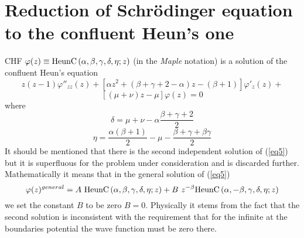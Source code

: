 \documentclass[singlespacing]{elsart}
\begin{document}
\section{Reduction of Schr\"odinger equation to the confluent Heun's one}
CHF $\varphi (z) \equiv {\rm HeunC}\left(\alpha,\beta,\gamma, \delta,
\eta;z\right)$  (in the {\sl {Maple}} notation) is a solution of the confluent Heun's equation
\[
z(z-1)\varphi''_{zz}(z)+\left[\alpha z^2+(\beta+\gamma+2-\alpha)z-\left(\beta+1\right)\right]\varphi'_z(z)+
\]
\begin{equation}
\label{eq5}
\left[(\mu+\nu)z-\mu\right]\varphi (z)=0
\end{equation}
where
\begin{equation}
\label{eq6}\delta=\mu+\nu-\alpha\frac{\beta+\gamma+2}{2}
\end{equation}
\begin{equation}
\label{eq7}\eta=\frac{\alpha\left(\beta+1\right)}{2}-\mu-\frac{\beta+\gamma+\beta\gamma}{2}
\end{equation}
It should be mentioned that there is the second independent solution of (\ref{eq5})
but it is superfluous for the problem under consideration and is discarded further. Mathematically it means that in the general solution of (\ref{eq5})
\[
\varphi (z)^{general}=A\ {\rm HeunC}\left(\alpha,\beta,\gamma, \delta,
\eta;z\right)+B\ z^{-\beta}{\rm HeunC}\left(\alpha,-\beta,\gamma, \delta,
\eta;z\right)
\]
we set the constant $B$ to be zero $B=0$. Physically it stems from the fact that the second solution is
inconsistent with the requirement that for the infinite at the boundaries potential the wave function must be zero there.
\end{document}

